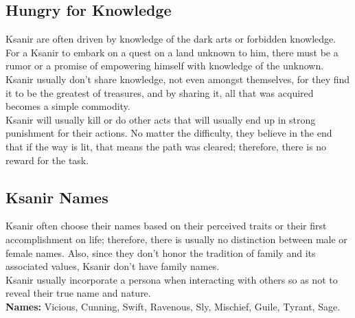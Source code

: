 \documentclass[10pt,twoside,twocolumn,openany]{book}
\begin{document}
\subsection{Hungry for Knowledge}

Ksanir are often driven by knowledge of the dark arts or forbidden knowledge. For a Ksanir to embark on a quest on a land unknown to him, there must be a rumor or a promise of empowering himself with knowledge of the unknown. Ksanir usually don't share knowledge, not even amongst themselves, for they find it to be the greatest of treasures, and by sharing it, all that was acquired becomes a simple commodity.\\
Ksanir will usually kill or do other acts that will usually end up in strong punishment for their actions. No matter the difficulty, they believe in the end that if the way is lit, that means the path was cleared; therefore, there is no reward for the task.

\subsection{Ksanir Names}

Ksanir often choose their names based on their perceived traits or their first accomplishment on life; therefore, there is usually no distinction between male or female names. Also, since they don't honor the tradition of family and its associated values, Ksanir don't have family names.\\
Ksanir usually incorporate a persona when interacting with others so as not to reveal their true name and nature.\\
\textbf{Names:} Vicious, Cunning, Swift, Ravenous, Sly, Mischief, Guile, Tyrant, Sage.
\end{document}
